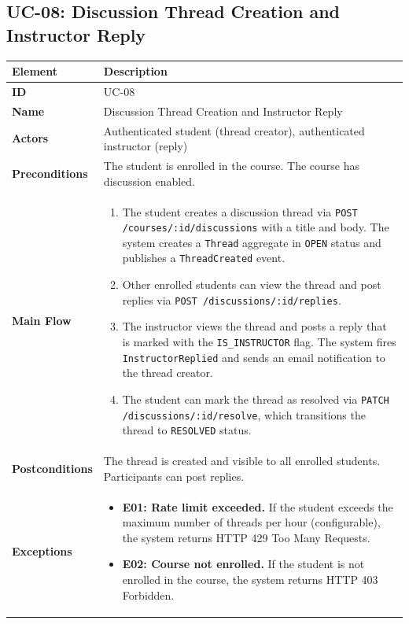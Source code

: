 \subsection{UC-08: Discussion Thread Creation and Instructor Reply}

\begin{longtable}{p{3cm}p{10cm}}
  \toprule
  \textbf{Element} & \textbf{Description} \\
  \midrule
  \endhead
  \midrule
  \endfoot
  \textbf{ID} & UC-08 \\
  \textbf{Name} & Discussion Thread Creation and Instructor Reply \\
  \textbf{Actors} & Authenticated student (thread creator), authenticated instructor (reply) \\
  \textbf{Preconditions} & The student is enrolled in the course. The course has discussion enabled. \\
  \textbf{Main Flow} &
  \begin{enumerate}
    \item The student creates a discussion thread via \texttt{POST /courses/:id/discussions} with a title and body. The system creates a \texttt{Thread} aggregate in \texttt{OPEN} status and publishes a \texttt{ThreadCreated} event.
    \item Other enrolled students can view the thread and post replies via \texttt{POST /discussions/:id/replies}.
    \item The instructor views the thread and posts a reply that is marked with the \texttt{IS\_INSTRUCTOR} flag. The system fires \texttt{InstructorReplied} and sends an email notification to the thread creator.
    \item The student can mark the thread as resolved via \texttt{PATCH /discussions/:id/resolve}, which transitions the thread to \texttt{RESOLVED} status.
  \end{enumerate} \\
  \textbf{Postconditions} & The thread is created and visible to all enrolled students. Participants can post replies. \\
  \textbf{Exceptions} &
  \begin{itemize}
    \item \textbf{E01: Rate limit exceeded.} If the student exceeds the maximum number of threads per hour (configurable), the system returns HTTP 429 Too Many Requests.
    \item \textbf{E02: Course not enrolled.} If the student is not enrolled in the course, the system returns HTTP 403 Forbidden.
  \end{itemize} \\
  \bottomrule
\end{longtable}

